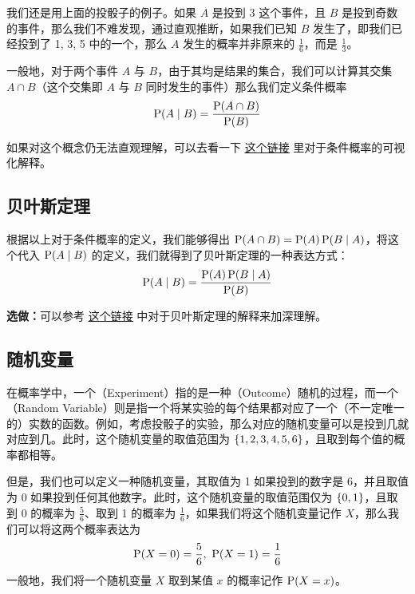 \documentclass{styles/main}
\begin{document}

  我们还是用上面的投骰子的例子。如果 $A$ 是投到 3 这个事件，且 $B$ 是投到奇数的事件，那么我们不难发现，通过直观推断，如果我们已知 $B$ 发生了，即我们已经投到了 1, 3, 5 中的一个，那么 $A$ 发生的概率并非原来的 $\frac{1}{6}$，而是 $\frac{1}{3}$。
  
  一般地，对于两个事件 $A$ 与 $B$，由于其均是结果的集合，我们可以计算其交集 $A \cap B$（这个交集即 $A$ 与 $B$ 同时发生的事件）那么我们定义条件概率
  $$ \operatorname{\mathrm{P}}(A \mid B) = \frac{\operatorname{\mathrm{P}}(A \cap B)}{\operatorname{\mathrm{P}}(B)} $$
  
  如果对这个概念仍无法直观理解，可以去看一下 \href{https://ocw.mit.edu/resources/res-6-012-introduction-to-probability-spring-2018/part-i-the-fundamentals/MITRES_6_012S18_L02.pdf}{\underline{这个链接}} 里对于条件概率的可视化解释。

\subsection{贝叶斯定理}
  
  根据以上对于条件概率的定义，我们能够得出 $\operatorname{\mathrm{P}}(A \cap B) = \operatorname{\mathrm{P}}(A) \operatorname{\mathrm{P}}(B \mid A)$，将这个代入 $\operatorname{\mathrm{P}}(A \mid B)$ 的定义，我们就得到了贝叶斯定理的一种表达方式：
  $$ \operatorname{\mathrm{P}}(A \mid B) = \frac{\operatorname{\mathrm{P}}(A) \operatorname{\mathrm{P}}(B \mid A)}{\operatorname{\mathrm{P}}(B)} $$
  
  \textbf{选做：}可以参考 \href{https://ocw.mit.edu/resources/res-6-012-introduction-to-probability-spring-2018/part-i-the-fundamentals/MITRES_6_012S18_L02.pdf}{\underline{这个链接}} 中对于贝叶斯定理的解释来加深理解。


\subsection{随机变量}
  
  在概率学中，一个（Experiment）指的是一种（Outcome）随机的过程，而一个（Random Variable）则是指一个将某实验的每个结果都对应了一个（不一定唯一的）实数的函数。例如，考虑投骰子的实验，那么对应的随机变量可以是投到几就对应到几。此时，这个随机变量的取值范围为 $\set{1, 2, 3, 4, 5, 6}$，且取到每个值的概率都相等。
  
  但是，我们也可以定义一种随机变量，其取值为 1 如果投到的数字是 6，并且取值为 0 如果投到任何其他数字。此时，这个随机变量的取值范围仅为 $\set{0, 1}$，且取到 0 的概率为 $\frac{5}{6}$、取到 1 的概率为 $\frac{1}{6}$，如果我们将这个随机变量记作 $X$，那么我们可以将这两个概率表达为
  $$ \operatorname{\mathrm{P}}(X = 0) = \frac{5}{6},\ \operatorname{\mathrm{P}}(X = 1) = \frac{1}{6} $$
  一般地，我们将一个随机变量 $X$ 取到某值 $x$ 的概率记作 $\operatorname{\mathrm{P}}(X = x)$。
  
\end{document}
